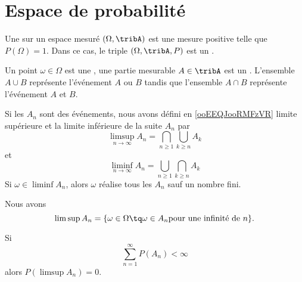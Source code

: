 
\section{Espace de probabilité}

Une  sur un espace mesuré \( (\Omega,\tribA)\) est une mesure positive telle que \( P(\Omega)=1\). Dans ce cas, le triple \( (\Omega,\tribA,P)\) est un .

Un point \( \omega\in\Omega\) est une , une partie mesurable \( A\in\tribA\) est un . L'ensemble \( A\cup B\) représente l'événement \( A\) ou \( B\) tandis que l'ensemble \( A\cap B\) représente l'événement \( A\) et \( B\).

Si les \( A_n\) sont des événements, nous avons défini en \ref{ooEEQJooRMFzVR} limite supérieure et la limite inférieure de la suite \( A_n\) par
\begin{equation}
    \limsup_{n\to\infty}A_n=\bigcap_{n\geq 1}\bigcup_{k\geq n}A_k
\end{equation}
et
\begin{equation}
    \liminf_{n\to\infty}A_n=\bigcup_{n\geq 1}\bigcap_{k\geq n}A_k
\end{equation}
Si \( \omega\in\liminf A_n\), alors \( \omega\) réalise tous les \( A_n\) sauf un nombre fini.

Nous avons
\begin{equation}
    \limsup A_n=\{ \omega\in\Omega\tq \omega\in A_n\text{pour une infinité de \( n\)} \}.
\end{equation}

\begin{theorem}
    Si
    \begin{equation}
        \sum_{n=1}^{\infty}P(A_n)<\infty
    \end{equation}
    alors \( P(\limsup A_n)=0\).
\end{theorem}

